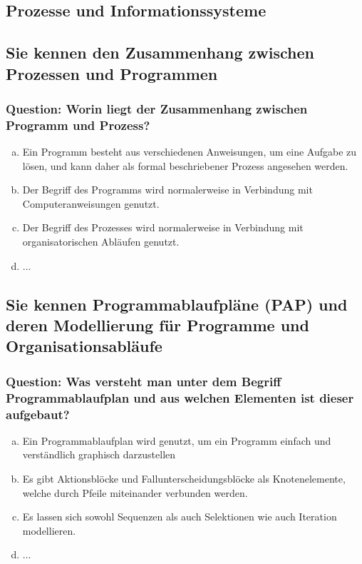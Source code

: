 \documentclass{article}
\begin{document}
\begin{adjustwidth}{2em}{2em}
		\newpage
			
		\section{Prozesse und Informationssysteme}
		\begin{adjustwidth}{2em}{2em}
			\subsection{Sie kennen den Zusammenhang zwischen Prozessen und Programmen}
			\begin{adjustwidth}{1em}{}
				\subsubsection*{Question: Worin liegt der Zusammenhang zwischen Programm und Prozess?}
				\begin{adjustwidth}{1em}{}
					\begin{enumerate}[(a)]
						\item Ein Programm besteht aus verschiedenen Anweisungen, um eine Aufgabe zu lösen, und kann daher als formal beschriebener Prozess angesehen werden.
						\item Der Begriff des Programms wird normalerweise in Verbindung mit Computeranweisungen genutzt.
						\item Der Begriff des Prozesses wird normalerweise in Verbindung mit organisatorischen Abläufen genutzt.
						\item ...
					\end{enumerate}
				\end{adjustwidth}
			\end{adjustwidth}
			\subsection{Sie kennen Programmablaufpläne (PAP) und deren Modellierung für Programme und Organisationsabläufe}
			\begin{adjustwidth}{1em}{}
				\subsubsection*{Question: Was versteht man unter dem Begriff Programmablaufplan und aus welchen Elementen ist dieser aufgebaut?}
				\begin{adjustwidth}{1em}{}
					\begin{enumerate}[(a)]
						\item Ein Programmablaufplan wird genutzt, um ein Programm einfach und verständlich graphisch darzustellen
						\item Es gibt Aktionsblöcke und Fallunterscheidungsblöcke als Knotenelemente, welche durch Pfeile miteinander verbunden werden.
						\item Es lassen sich sowohl Sequenzen als auch Selektionen wie auch Iteration modellieren.
						\item ...
					\end{enumerate}
				\end{adjustwidth}
			\end{adjustwidth}

\end{adjustwidth}
\end{adjustwidth}
\end{document}
